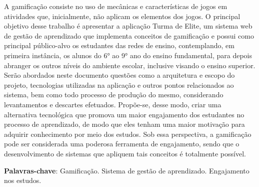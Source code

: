 \documentclass[
    12pt,               %
    openright,          %
    oneside,
    a4paper,            %
    english,            %
    brazil              %
    ]{ifsp-spo-inf-ctds} %
\begin{document}
\setlength{\absparsep}{18pt} %
\begin{resumo}

 \vspace{\onelineskip}

 A gamificação consiste no uso de mecânicas e características de jogos em atividades que, inicialmente, não aplicam os elementos dos jogos. O principal objetivo desse trabalho é apresentar a aplicação Turma de Elite, um sistema web de gestão de aprendizado que implementa conceitos de gamificação e possui como principal público-alvo os estudantes das redes de ensino, contemplando, em primeira instância, os alunos do 6° ao 9° ano do ensino fundamental, para depois abranger os outros níveis do ambiente escolar, inclusive visando o ensino superior. Serão abordados neste documento questões como a arquitetura e escopo do projeto, tecnologias utilizadas na aplicação e outros pontos relacionados ao sistema, bem como todo processo de produção do mesmo, considerando levantamentos e descartes efetuados. 
 Propõe-se, desse modo, criar uma alternativa tecnológica que promova um maior engajamento dos estudantes no processo de aprendizado, de modo que eles tenham uma maior motivação para adquirir conhecimento por meio dos estudos. Sob essa perspectiva, a gamificação pode ser considerada uma poderosa ferramenta de engajamento, sendo que o desenvolvimento de sistemas que apliquem tais conceitos é totalmente possível.
 
 \vspace{\onelineskip}
 
 \textbf{Palavras-chave}: Gamificação. Sistema de gestão de aprendizado. Engajamento nos estudos.
 
\end{resumo}
\end{document}

